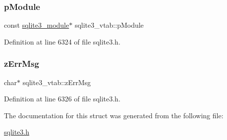 \subsubsection{\texorpdfstring{p\+Module}{pModule}}
{\footnotesize\ttfamily const \mbox{\hyperlink{structsqlite3__module}{sqlite3\+\_\+module}}$\ast$ sqlite3\+\_\+vtab\+::p\+Module}



Definition at line 6324 of file sqlite3.\+h.

\mbox{\label{structsqlite3__vtab_afc50eadfdd7cef876633d460deba48d6}} 
\subsubsection{\texorpdfstring{z\+Err\+Msg}{zErrMsg}}
{\footnotesize\ttfamily char$\ast$ sqlite3\+\_\+vtab\+::z\+Err\+Msg}



Definition at line 6326 of file sqlite3.\+h.



The documentation for this struct was generated from the following file\+:\begin{DoxyCompactItemize}
\item 
\mbox{\hyperlink{sqlite3_8h}{sqlite3.\+h}}\end{DoxyCompactItemize}
